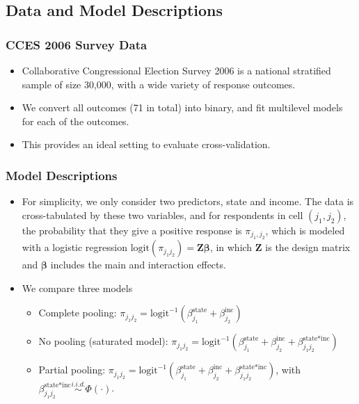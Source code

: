 \documentclass[xetex,mathserif,serif]{beamer}
\begin{document}
\subsection{Data and Model Descriptions}
\begin{frame}
  \frametitle{CCES 2006 Survey Data}
  \begin{itemize}
  \item Collaborative Congressional Election Survey 2006 is a national stratified
    sample of size 30,000, with a wide variety of response outcomes. 
  \item We convert all outcomes (71 in total) into binary, and fit multilevel
    models for each of the outcomes.
  \item This provides an ideal setting to evaluate cross-validation.
  \end{itemize}
\end{frame}

\begin{frame}
  \frametitle{Model Descriptions}
  \begin{itemize}
  \item For simplicity, we only consider two predictors, state and income. The
    data is cross-tabulated by these two variables, and for respondents in cell
    $(j_1,j_2)$, the probability that they give a positive response is
    $\pi_{j_1,j_2}$, which is modeled with a logistic regression
    $\text{logit}(\pi_{j_1j_2})=\bm Z\bm\beta$, in which $\bm Z$ is the design
    matrix and $\bm\beta$ includes the main and interaction effects.
  \item We compare three models
    \begin{itemize}
    \item Complete pooling:
      $    \pi_{j_1j_2}=\text{logit}^{-1}\left(\beta^{\text{state}}_{j_1}+\beta^{\text{inc}}_{j_2}\right)$
    \item No pooling (saturated model): $
      \pi_{j_1j_2}=\text{logit}^{-1}\left(\beta^{\text{state}}_{j_1}+\beta^{\text{inc}}_{j_2}+\beta^{\text{state*inc}}_{j_1j_2}\right)$
    \item
      Partial pooling:
      $ \pi_{j_1j_2}=\text{logit}^{-1}\left(\beta^{\text{state}}_{j_1}+\beta^{\text{inc}}_{j_2}+\beta^{\text{state*inc}}_{j_1j_2}\right)$, with
      $\beta^{\text{state*inc}}_{j_1j_2}\stackrel{i.i.d.}{\sim} \Phi(\cdot)$.
    \end{itemize}
  \end{itemize}
\end{frame}
\end{document}
